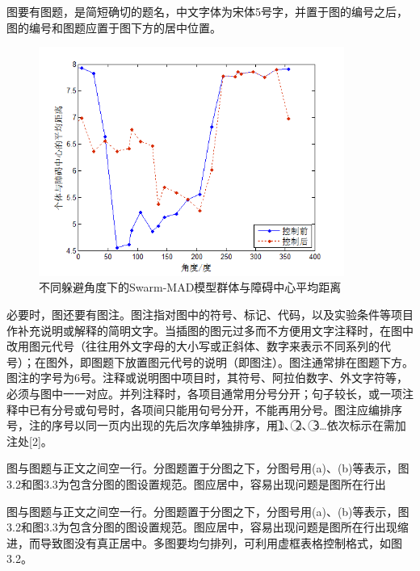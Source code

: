 图要有图题，是简短确切的题名，中文字体为宋体5号字，并置于图的编号之后，图的编号和图题应置于图下方的居中位置。
\begin{figure}[htbp]
	\centering
	\includegraphics[width=10cm]{images/chapters/3.1}
	\caption{不同躲避角度下的Swarm-MAD模型群体与障碍中心平均距离} 
	\label{fig:3.1} 
\end{figure}

必要时，图还要有图注。图注指对图中的符号、标记、代码，以及实验条件等项目作补充说明或解释的简明文字。当插图的图元过多而不方便用文字注释时，在图中改用图元代号（往往用外文字母的大小写或正斜体、数字来表示不同系列的代号）；在图外，即图题下放置图元代号的说明（即图注）。图注通常排在图题下方。图注的字号为6号。注释或说明图中项目时，其符号、阿拉伯数字、外文字符等，必须与图中一一对应。并列注释时，各项目通常用分号分开；句子较长，或一项注释中已有分号或句号时，各项间只能用句号分开，不能再用分号。图注应编排序号，注的序号以同一页内出现的先后次序单独排序，用\textcircled{1}、\textcircled{2}、\textcircled{3}…依次标示在需加注处[2]。

图与图题与正文之间空一行。分图题置于分图之下，分图号用(a)、(b)等表示，图3.2和图3.3为包含分图的图设置规范。图应居中，容易出现问题是图所在行出

图与图题与正文之间空一行。分图题置于分图之下，分图号用(a)、(b)等表示，图3.2和图3.3为包含分图的图设置规范。图应居中，容易出现问题是图所在行出现缩进，而导致图没有真正居中。多图要均匀排列，可利用虚框表格控制格式，如图3.2。

